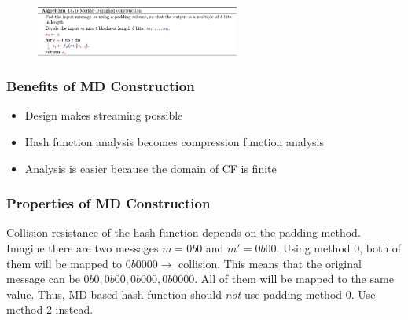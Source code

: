 \begin{figure}[h!]
    \centering
    \includegraphics[width=0.6\textwidth]{img/MDalgorithm.png}
\end{figure}

\subsubsection{Benefits of MD Construction}
\begin{itemize}
\item Design makes streaming possible
\item Hash function analysis becomes compression function analysis
\item Analysis is easier because the domain of CF is finite
\end{itemize}

\subsubsection{Properties of MD Construction}
Collision resistance of the hash function depends on the padding method. Imagine there are two messages $m=0b0$ and $m'=0b00$. 
Using method 0, both of them will be mapped to $0b0000 \rightarrow$ collision.
This means that the original message can be $0b0, 0b00, 0b000, 0b0000$. All of them will be mapped to the same value.
Thus, MD-based hash function should \emph{not} use padding method 0. Use method 2 instead.

